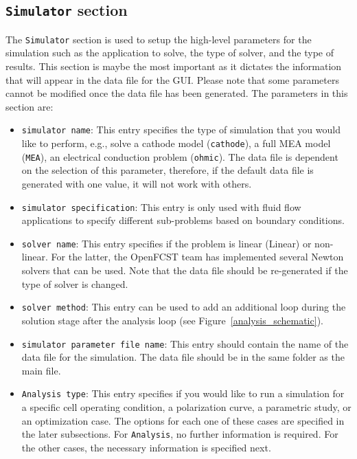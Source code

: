 \subsection{\texttt{Simulator} section}
The \texttt{Simulator} section is used to setup the high-level parameters for the simulation such as the application to solve, the type of solver, and the type of results. This section is maybe the most important as it dictates the information that will appear in the data file for the GUI. Please note that some parameters cannot be modified once the data file has been generated. The parameters in this section are:
\begin{itemize}
 \item \texttt{simulator name}: This entry specifies the type of simulation that you would like to perform, e.g., solve a cathode model (\texttt{cathode}), a full MEA model (\texttt{MEA}), an electrical conduction problem (\texttt{ohmic}). The data file is dependent on the selection of this parameter, therefore, if the default data file is generated with one value, it will not work with others.
 \item \texttt{simulator specification}: This entry is only used with fluid flow applications to specify different sub-problems based on boundary conditions.
 \item \texttt{solver name}: This entry specifies if the problem is linear (Linear) or non-linear. For the latter, the OpenFCST team has implemented several Newton solvers that can be used. Note that the data file should be re-generated if the type of solver is changed.
 \item \texttt{solver method}: This entry can be used to add an additional loop during the solution stage after the analysis loop (see Figure~\ref{analysis_schematic}).
 \item \texttt{simulator parameter file name}: This entry should contain the name of the data file for the simulation. The data file should be in the same folder as the main file.
 \item \texttt{Analysis type}: This entry specifies if you would like to run a simulation for a specific cell operating condition, a polarization curve, a parametric study, or an optimization case. The options for each one of these cases are specified in the later subsections. For \texttt{Analysis}, no further information is required. For the other cases, the necessary information is specified next.
\end{itemize}

